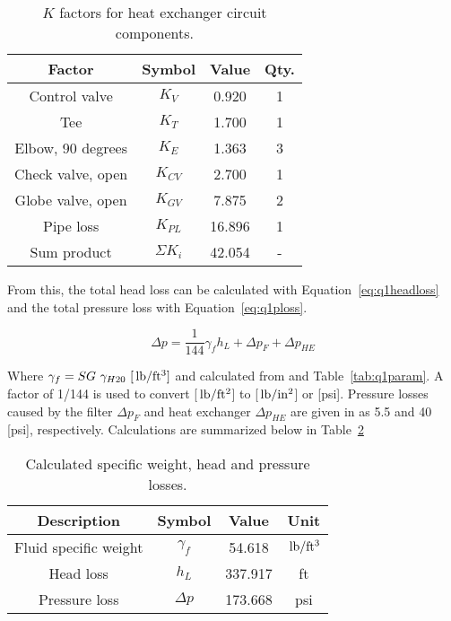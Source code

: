 \begin{table}[H]
  \centering
  \caption{$K$ factors for heat exchanger circuit components.}
    \begin{tabular}{cccc}
    \toprule
    \textbf{Factor} & \textbf{Symbol} & \textbf{Value } & \textbf{Qty.} \\
    \midrule
    Control valve & $K_V$ & 0.920 & 1 \\
    Tee   & $K_T$ & 1.700 & 1 \\
    Elbow, 90 degrees & $K_E$ & 1.363 & 3 \\
    Check valve, open & $K_{CV}$ & 2.700 & 1 \\
    Globe valve, open & $K_{GV}$ & 7.875 & 2 \\
    Pipe loss & $K_{PL}$ & 16.896 & 1 \\
    Sum product  & $\Sigma K_i$   & 42.054 & - \\
    \bottomrule
    \end{tabular}
  \label{tab:kfact}
\end{table}

From this, the total head loss can be calculated with Equation~\ref{eq:q1headloss} and the total pressure loss with Equation~\ref{eq:q1ploss}. 

\begin{equation}
	\label{eq:q1ploss}	
	\Delta p = \frac{1}{144}\gamma_f h_L + \Delta p_F + \Delta p_{HE} 
\end{equation}

Where $\gamma_f = SG\  \gamma_{H20} \ [\Unit{lb/ft^3}]$ and calculated from \cite{fluids} and Table~\ref{tab:q1param}. A factor of 1/144 is used to convert [$\,\mathrm{lb/ft^2}$] to [$\,\mathrm{lb/in^2}$] or [psi]. Pressure losses caused by the filter $\Delta p_F$ and heat exchanger $\Delta p_{HE}$ are given in \cite{assign} as 5.5 and 40 [psi], respectively. Calculations are summarized below in Table~\ref{tab:q1plossa}

\begin{table}[H]
  \centering
  \caption{Calculated specific weight, head and pressure losses.}
    \begin{tabular}{cccc}
    \toprule
    \textbf{Description} & \textbf{Symbol} & \textbf{Value} & \textbf{Unit} \\
    \midrule
    Fluid specific weight & $\gamma_f$ & 54.618 & $\,\mathrm{lb/ft^3}$\\
    Head loss & $h_L$ & 337.917 & ft \\
    Pressure loss & $\Delta p$ & 173.668 & psi \\
    \bottomrule
    \end{tabular}
  \label{tab:q1plossa}
\end{table}

